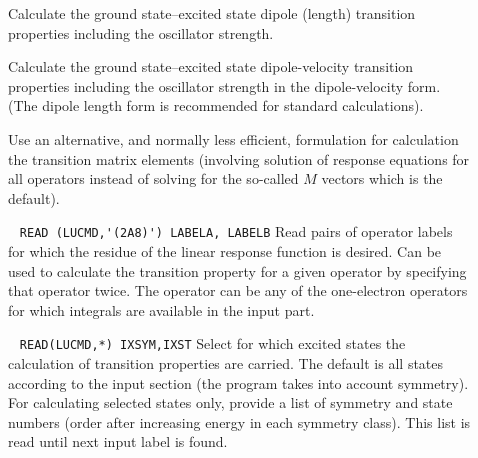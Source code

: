 \begin{description}
\item[] 

Calculate the ground state--excited state dipole (length) transition properties including
the oscillator strength.

\item[] 
%
Calculate the ground state--excited state dipole-velocity  transition properties including
the oscillator strength in the dipole-velocity form. (The dipole length form is recommended
for standard calculations).

\item[] 
%
Use an alternative, and normally less efficient, formulation for calculation
the transition matrix elements (involving solution of response equations for 
all operators instead of solving for the so-called $M$ vectors which is the default).

\item[] \verb| |\newline
\verb|READ (LUCMD,'(2A8)') LABELA, LABELB|\newline
%
Read pairs of operator labels for which the residue of the linear response function is desired.
Can be used to calculate the transition property for a given operator
by specifying that operator twice. The operator can be any of the one-electron
operators for which integrals are available in the  input part.

\item[]\verb| |\newline 
\verb|READ(LUCMD,*) IXSYM,IXST|\newline
%
Select for which excited states the calculation of transition properties
are carried. The default is all states according to the  input section
(the program takes into account symmetry). For calculating selected states only,
provide a list of symmetry and state numbers (order after increasing energy in 
each symmetry class). This list is read until next input label is found.

\end{description}
